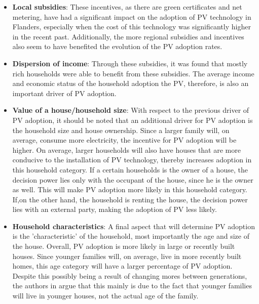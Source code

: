 \begin{itemize}
    \item \textbf{Local subsidies}: These incentives, as there are green certificates and net metering, have had a significant impact on the adoption of PV technology in Flanders, especially when the cost of this technology was significantly higher in the recent past. Additionally, the more regional subsidies and incentives also seem to have benefited the evolution of the PV adoption rates.
    \item \textbf{Dispersion of income}: Through these subsidies, it was found that mostly rich households were able to benefit from these subsidies. The average income and economic status of the household adoption the PV, therefore, is also an important driver of PV adoption. 
    \item \textbf{Value of a house/household size}: With respect to the previous driver of PV adoption, it should be noted that an additional driver for PV adoption is the household size and house ownership. Since a larger family will, on average, consume more electricity, the incentive for PV adoption will be higher. On average, larger households will also have houses that are more conducive to the installation of PV technology, thereby increases adoption in this household category. If a certain households is the owner of a house, the decision power lies only with the occupant of the house, since he is the owner as well. This will make PV adoption more likely in this household category. If,on the other hand, the household is renting the house, the decision power lies with an external party, making the adoption of PV less likely.
    \item \textbf{Household characteristics}: A final aspect that will determine PV adoption is the 'characteristic' of the household, most importantly the age and size of the house. Overall, PV adoption is more likely in large or recently built houses. Since younger families will, on average, live in more recently built homes, this age category will have a larger percentage of PV adoption.  Despite this possibly being a result of changing mores between generations, the authors in \cite{FlandersAdoption} argue that this mainly is due to the fact that younger families will live in younger houses, not the actual age of the family.  
\end{itemize}
